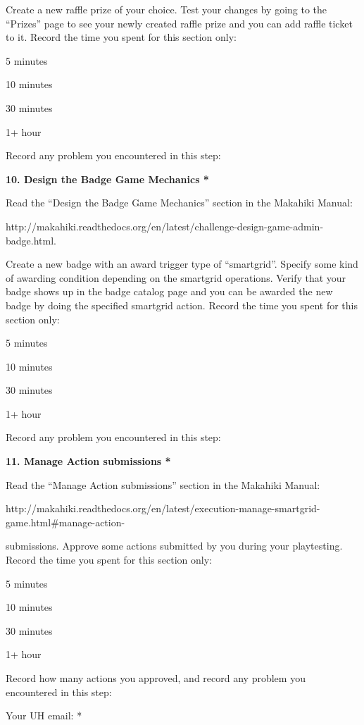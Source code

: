 Create a new raffle prize of your choice. Test your changes by going to the ``Prizes'' page to see your newly created raffle prize and you can add raffle ticket to it. Record the time you spent for this section only:

\begin{radiobutton}
\item 5 minutes
\item  10 minutes
\item  30 minutes
\item  1+ hour
\end{radiobutton}

Record any problem you encountered in this step: \underline{\hspace{4cm}}

{\bf 10. Design the Badge Game Mechanics *}

Read the ``Design the Badge Game Mechanics'' section in the Makahiki Manual:

http://makahiki.readthedocs.org/en/latest/challenge-design-game-admin-badge.html. 

Create a new badge with an award trigger type of ``smartgrid''. Specify some kind of awarding condition depending on the smartgrid operations. Verify that your badge shows up in the badge catalog page and you can be awarded the new badge by doing the specified smartgrid action. Record the time you spent for this section only:

\begin{radiobutton}
\item 5 minutes
\item  10 minutes
\item  30 minutes
\item  1+ hour
\end{radiobutton}

Record any problem you encountered in this step: \underline{\hspace{4cm}}

{\bf 11. Manage Action submissions *}

Read the ``Manage Action submissions'' section in the Makahiki Manual:

http://makahiki.readthedocs.org/en/latest/execution-manage-smartgrid-game.html\#manage-action-

submissions. Approve some actions submitted by you during your playtesting. Record the time you spent for this section only:

\begin{radiobutton}
\item 5 minutes
\item  10 minutes
\item  30 minutes
\item  1+ hour
\end{radiobutton}

Record how many actions you approved, and record any problem you encountered in this step: 

\underline{\hspace{4cm}}

Your UH email: * \underline{\hspace{4cm}}

